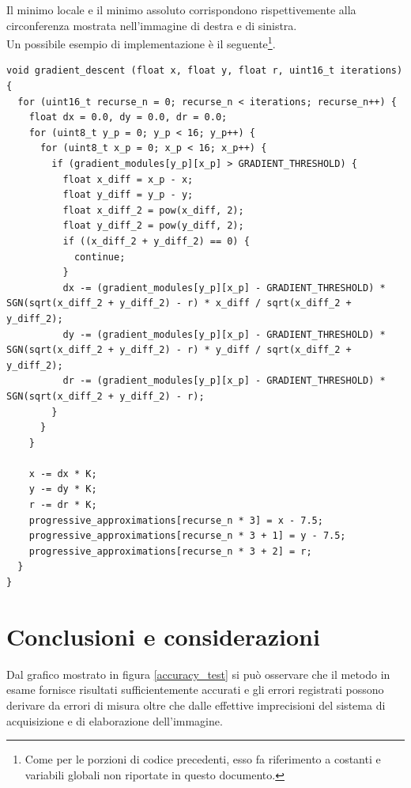 \documentclass[12pt]{article}
\newenvironment{changemargin}[2]{%
    \begin{list}{}{%
    \setlength{\topsep}{0pt}%
    \setlength{\leftmargin}{#1}%
    \setlength{\rightmargin}{#2}%
    \setlength{\listparindent}{\parindent}%
    \setlength{\itemindent}{\parindent}%
    \setlength{\parsep}{\parskip}%
    }%
    \item[]}{\end{list}}
\begin{document}
        Il minimo locale e il minimo assoluto corrispondono rispettivemente alla circonferenza mostrata nell'immagine di destra e di sinistra.\\

        \newpage
        Un possibile esempio di implementazione è il seguente\footnote{Come per le porzioni di codice precedenti, esso fa riferimento a costanti e variabili globali non riportate in questo documento.}.
        
        \begin{changemargin}{-2cm}{-2cm}
        \begin{lstlisting}[label={list:gradient_descent}, style=Arduino, caption=Ricerca minimi - discesa del gradiente, basicstyle=\scriptsize]
void gradient_descent (float x, float y, float r, uint16_t iterations) {
  for (uint16_t recurse_n = 0; recurse_n < iterations; recurse_n++) {
    float dx = 0.0, dy = 0.0, dr = 0.0;
    for (uint8_t y_p = 0; y_p < 16; y_p++) {
      for (uint8_t x_p = 0; x_p < 16; x_p++) {
        if (gradient_modules[y_p][x_p] > GRADIENT_THRESHOLD) {
          float x_diff = x_p - x;
          float y_diff = y_p - y;
          float x_diff_2 = pow(x_diff, 2);
          float y_diff_2 = pow(y_diff, 2);
          if ((x_diff_2 + y_diff_2) == 0) {
            continue;
          }
          dx -= (gradient_modules[y_p][x_p] - GRADIENT_THRESHOLD) * SGN(sqrt(x_diff_2 + y_diff_2) - r) * x_diff / sqrt(x_diff_2 + y_diff_2);
          dy -= (gradient_modules[y_p][x_p] - GRADIENT_THRESHOLD) * SGN(sqrt(x_diff_2 + y_diff_2) - r) * y_diff / sqrt(x_diff_2 + y_diff_2);
          dr -= (gradient_modules[y_p][x_p] - GRADIENT_THRESHOLD) * SGN(sqrt(x_diff_2 + y_diff_2) - r);
        }
      }
    }

    x -= dx * K;
    y -= dy * K;
    r -= dr * K;
    progressive_approximations[recurse_n * 3] = x - 7.5;
    progressive_approximations[recurse_n * 3 + 1] = y - 7.5;
    progressive_approximations[recurse_n * 3 + 2] = r;
  }
}       \end{lstlisting}
        \end{changemargin}

    \newpage
    \section{Conclusioni e considerazioni}
    Dal grafico mostrato in figura \ref{accuracy_test} si può osservare che il metodo in esame fornisce risultati sufficientemente accurati e gli errori registrati possono derivare da errori di misura oltre che dalle effettive imprecisioni del sistema di acquisizione e di elaborazione dell'immagine.
    
\end{document}
